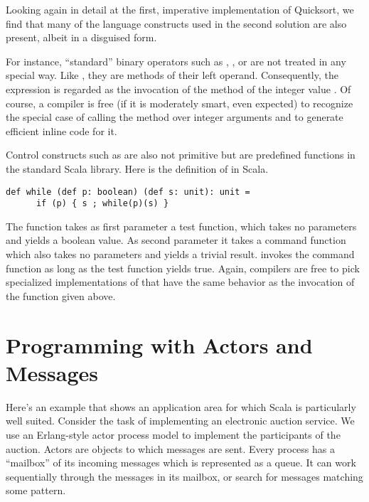 \documentclass[a4paper,12pt,twoside,titlepage]{book}
\begin{document}
Looking again in detail at the first, imperative implementation of
Quicksort, we find that many of the language constructs used in the
second solution are also present, albeit in a disguised form.

For instance, ``standard'' binary operators such as \code{+},
\code{-}, or \code{<} are not treated in any special way. Like
, they are methods of their left operand. Consequently,
the expression  is regarded as the invocation
 of the \code{+} method of the integer value .
Of course, a compiler is free (if it is moderately smart, even expected)
to recognize the special case of calling the \code{+} method over
integer arguments and to generate efficient inline code for it.

Control constructs such as  are also not primitive but are
predefined functions in the standard Scala library. Here is the
definition of  in Scala.
\begin{lstlisting}
def while (def p: boolean) (def s: unit): unit =
      if (p) { s ; while(p)(s) }
\end{lstlisting}
The  function takes as first parameter a test function,
which takes no parameters and yields a boolean value. As second
parameter it takes a command function which also takes no parameters
and yields a trivial result.  invokes the command function
as long as the test function yields true. Again, compilers are free to
pick specialized implementations of  that have the same
behavior as the invocation of the function given above.

\chapter{Programming with Actors and Messages}
\label{chap:example-auction}

Here's an example that shows an application area for which Scala is
particularly well suited. Consider the task of implementing an
electronic auction service. We use an Erlang-style actor process
model to implement the participants of the auction. Actors are
objects to which messages are sent. Every process has a ``mailbox'' of
its incoming messages which is represented as a queue. It can work
sequentially through the messages in its mailbox, or search for
messages matching some pattern.
\end{document}

